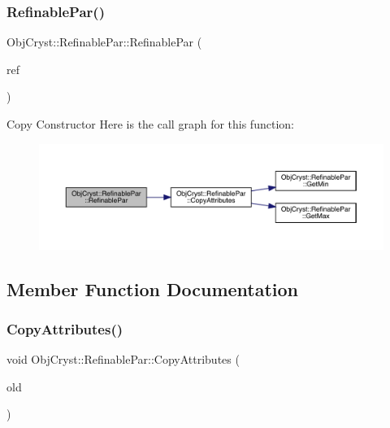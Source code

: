 \subsubsection{\texorpdfstring{RefinablePar()}{RefinablePar()}\hspace{0.1cm}{\footnotesize\ttfamily [3/3]}}
{\footnotesize\ttfamily Obj\+Cryst\+::\+Refinable\+Par\+::\+Refinable\+Par (\begin{DoxyParamCaption}\item[{const \mbox{\hyperlink{class_obj_cryst_1_1_refinable_par}{Refinable\+Par}} \&}]{ref }\end{DoxyParamCaption})}

Copy Constructor Here is the call graph for this function\+:
\nopagebreak
\begin{figure}[H]
\begin{center}
\leavevmode
\includegraphics[width=350pt]{class_obj_cryst_1_1_refinable_par_a99cdc4550c46d90daf63b7f2e6d8d3c3_cgraph}
\end{center}
\end{figure}


\subsection{Member Function Documentation}
\mbox{\label{class_obj_cryst_1_1_refinable_par_a5882aec9561125f6e81b81f175031652}} 
\subsubsection{\texorpdfstring{CopyAttributes()}{CopyAttributes()}}
{\footnotesize\ttfamily void Obj\+Cryst\+::\+Refinable\+Par\+::\+Copy\+Attributes (\begin{DoxyParamCaption}\item[{const \mbox{\hyperlink{class_obj_cryst_1_1_refinable_par}{Refinable\+Par}} \&}]{old }\end{DoxyParamCaption})}

